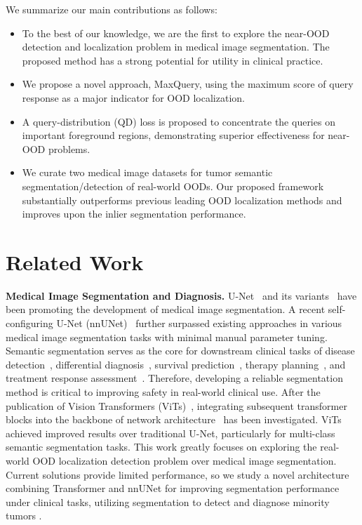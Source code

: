 \documentclass[10pt,twocolumn,letterpaper]{article}
\begin{document}
We summarize our main contributions as follows:
\begin{itemize}
    \item To the best of our knowledge, we are the first to explore the near-OOD detection and localization problem in medical image segmentation. The proposed method has a strong potential for utility in clinical practice.
    \item We propose a novel approach, MaxQuery, using the maximum score of query response as a major indicator for OOD localization. 
    \item A query-distribution (QD) loss is proposed to concentrate the queries on important foreground regions, demonstrating superior effectiveness for near-OOD problems.
    \item We curate two medical image datasets for tumor semantic segmentation/detection of real-world OODs. Our proposed framework substantially outperforms previous leading OOD localization methods and improves upon the inlier segmentation performance.
\end{itemize}
\section{Related Work}
\label{sec:related}

{\bf Medical Image Segmentation and Diagnosis.} U-Net~\cite{ronneberger2015u_unet0} and its variants~\cite{li2017h_unet1,liu20173d_unet2,milletari2016v_unet3,yu2017volumetric_unet4,zhou2019unet++_unet7} have been promoting the development of medical image segmentation. A recent self-configuring U-Net (nnUNet)~\cite{isensee2018nnu,isensee2021nnu} further surpassed existing approaches in various medical image segmentation tasks with minimal manual parameter tuning. Semantic segmentation serves as the core for downstream clinical tasks of disease detection~\cite{chu2019application}, differential diagnosis~\cite{de2018clinically,zhao20213d}, survival prediction~\cite{yao2022deep}, therapy planning~\cite{tang2019clinically}, and treatment response assessment~\cite{kickingereder2019automated}. Therefore, developing a reliable segmentation method is critical to improving safety in real-world clinical use. After the publication of Vision Transformers (ViTs)~\cite{dosovitskiy2020image}, integrating subsequent transformer blocks into the backbone of network architecture~\cite{chen2021transunet, hatamizadeh2022unetr,hatamizadeh2022swin,tang2022self_swinunetr} has been investigated. ViTs achieved improved results over traditional U-Net, particularly for multi-class semantic segmentation tasks. This work greatly focuses on exploring the real-world OOD localization detection problem over medical image segmentation. Current solutions provide limited performance, so we study a novel architecture combining Transformer and nnUNet for improving segmentation performance under clinical tasks, utilizing segmentation to detect and diagnose minority tumors \cite{zhao20213d}. 
\end{document}
